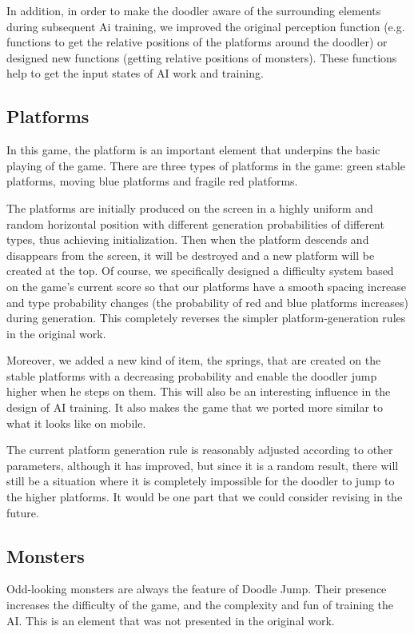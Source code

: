\documentclass[final]{cvpr}
\begin{document}
 In addition, in order to make the doodler aware of the surrounding elements during subsequent Ai training, we improved the original perception function (e.g. functions to get the relative positions of the platforms around the doodler) or designed new functions (getting relative positions of monsters). These functions help to get the input states of AI work and training.
 
\subsection{Platforms}
In this game, the platform is an important element that underpins the basic playing of the game. There are three types of platforms in the game: green stable platforms, moving blue platforms and fragile red platforms.

The platforms are initially produced on the screen in a highly uniform and random horizontal position with different generation probabilities of different types, thus achieving initialization.
Then when the platform descends and disappears from the screen, it will be destroyed and a new platform will be created at the top. Of course, we specifically designed a difficulty system based on the game's current score so that our platforms have a smooth spacing increase and type probability changes (the probability of red and blue platforms increases) during generation. This completely reverses the simpler platform-generation rules in the original work.

Moreover, we added a new kind of item, the springs, that are created on the stable platforms with a decreasing probability and enable the doodler jump higher when he steps on them. This will also be an interesting influence in the design of AI training. It also makes the game that we ported more similar to what it looks like on mobile.

The current platform generation rule is reasonably adjusted according to other parameters, although it has improved, but since it is a random result, there will still be a situation where it is completely impossible for the doodler to jump to the higher platforms. It would be one part that we could consider revising in the future.

\subsection{Monsters}
Odd-looking monsters are always the feature of Doodle Jump. Their presence increases the difficulty of the game, and the complexity and fun of training the AI. This is an element that was not presented in the original work.
\end{document}
